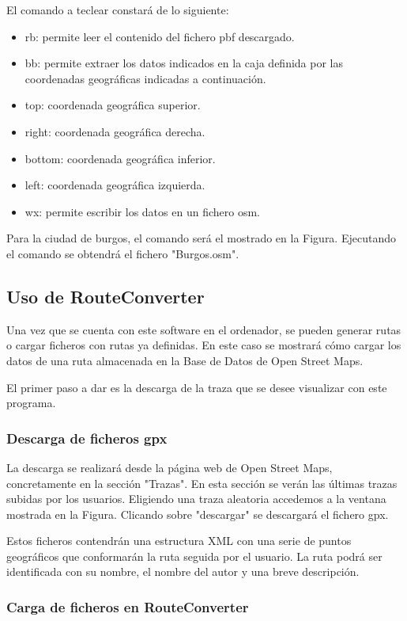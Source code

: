 El comando a teclear constará de lo siguiente:
\begin{itemize}
	\item rb: permite leer el contenido del fichero pbf descargado.
	\item bb: permite extraer los datos indicados en la caja definida por las coordenadas geográficas indicadas a continuación.
	\item top: coordenada geográfica superior.
	\item right: coordenada geográfica derecha.
	\item bottom: coordenada geográfica inferior.
	\item left: coordenada geográfica izquierda.
	\item wx: permite escribir los datos en un fichero osm.
\end{itemize}

Para la ciudad de burgos, el comando será el mostrado en la Figura. Ejecutando el comando se obtendrá el fichero "Burgos.osm".


\subsection{Uso de RouteConverter}

Una vez que se cuenta con este software en el ordenador, se pueden generar rutas o cargar ficheros con rutas ya definidas. En este caso se mostrará cómo cargar los datos de una ruta almacenada en la Base de Datos de Open Street Maps.

El primer paso a dar es la descarga de la traza que se desee visualizar con este programa.

\subsubsection{Descarga de ficheros gpx}
La descarga se realizará desde la página web de Open Street Maps, concretamente en la sección "Trazas". En esta sección se verán las últimas trazas subidas por los usuarios. Eligiendo una traza aleatoria accedemos a la ventana mostrada en la  Figura. Clicando sobre "descargar" se descargará el fichero gpx.

Estos ficheros contendrán una estructura XML con una serie de puntos geográficos que conformarán la ruta seguida por el usuario. La ruta podrá ser identificada con su nombre, el nombre del autor y una breve descripción.

\subsubsection{Carga de ficheros en RouteConverter}

